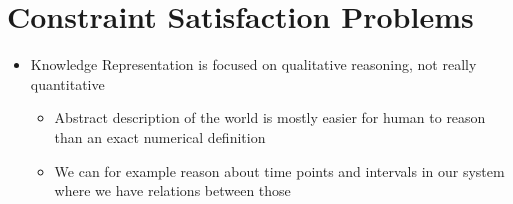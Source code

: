 \section{Constraint Satisfaction Problems}
\begin{itemize}
	\item Knowledge Representation is focused on qualitative reasoning, not really quantitative
	\begin{itemize}
		\item Abstract description of the world is mostly easier for human to reason than an exact numerical definition 
		\item We can for example reason about time points and intervals in our system where we have relations between those
	\end{itemize}
\end{itemize}
